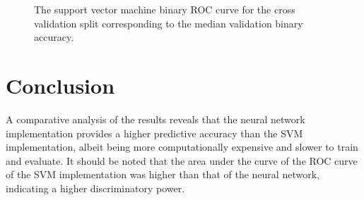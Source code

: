 \documentclass[twocolumn]{article}
\begin{document}
\begin{figure}
\begin{center}
\end{center}
\caption{The support vector machine binary ROC curve for the cross validation
  split corresponding to the median validation binary accuracy.}
\label{fig:SupportVectorMachineROC}
\end{figure}

\section{Conclusion}
\label{sec:Conclusion}

A comparative analysis of the results reveals that the neural network
implementation provides a higher predictive accuracy than the SVM
implementation, albeit being more computationally expensive and slower to train
and evaluate. It should be noted that the area under the curve of the ROC curve
of the SVM implementation was higher than that of the neural network, indicating
a higher discriminatory power.

\printbibliography
\end{document}
